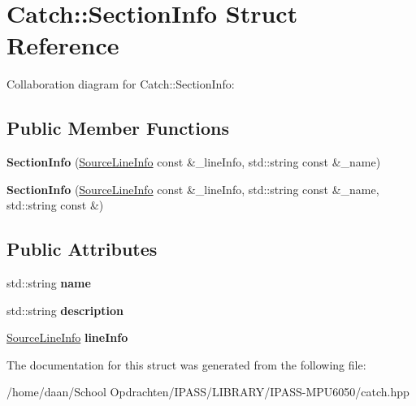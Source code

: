 \hypertarget{structCatch_1_1SectionInfo}{}\section{Catch\+:\+:Section\+Info Struct Reference}
\label{structCatch_1_1SectionInfo}


Collaboration diagram for Catch\+:\+:Section\+Info\+:
\subsection*{Public Member Functions}
\begin{DoxyCompactItemize}
\item 
\mbox{\label{structCatch_1_1SectionInfo_a2808437ae7d4bc0830cee1c3995165a6}} 
{\bfseries Section\+Info} (\hyperlink{structCatch_1_1SourceLineInfo}{Source\+Line\+Info} const \&\+\_\+line\+Info, std\+::string const \&\+\_\+name)
\item 
\mbox{\label{structCatch_1_1SectionInfo_a139875f2e7bd12a5898a948f8bad15b3}} 
{\bfseries Section\+Info} (\hyperlink{structCatch_1_1SourceLineInfo}{Source\+Line\+Info} const \&\+\_\+line\+Info, std\+::string const \&\+\_\+name, std\+::string const \&)
\end{DoxyCompactItemize}
\subsection*{Public Attributes}
\begin{DoxyCompactItemize}
\item 
\mbox{\label{structCatch_1_1SectionInfo_a704c8fc662d309137e0d4f199cb7df58}} 
std\+::string {\bfseries name}
\item 
\mbox{\label{structCatch_1_1SectionInfo_a0052060219a6de74bb7ade34d4163a4e}} 
std\+::string {\bfseries description}
\item 
\mbox{\label{structCatch_1_1SectionInfo_adbc83b8a3507c4acc8ee249e93465711}} 
\hyperlink{structCatch_1_1SourceLineInfo}{Source\+Line\+Info} {\bfseries line\+Info}
\end{DoxyCompactItemize}


The documentation for this struct was generated from the following file\+:\begin{DoxyCompactItemize}
\item 
/home/daan/\+School Opdrachten/\+I\+P\+A\+S\+S/\+L\+I\+B\+R\+A\+R\+Y/\+I\+P\+A\+S\+S-\/\+M\+P\+U6050/catch.\+hpp\end{DoxyCompactItemize}
